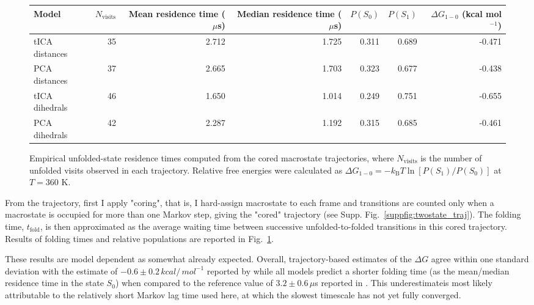 \documentclass[prl,twocolumn]{revtex4-1}
\begin{document}
\begin{figure}[t]
    \centering
        \begin{tabular}{lrrrrrr}
            \hline
            Model
            & $N_{\mathrm{visits}}$
            & Mean residence time ($\mu$s)
            & Median residence time ($\mu$s)
            & $P(S_0)$
            & $P(S_1)$
            & $\Delta G_{1-0}$ (kcal mol$^{-1}$) \\
            \hline
            tICA distances  & 35 & 2.712 & 1.725 & 0.311 & 0.689 & -0.471 \\
            PCA distances   & 37 & 2.665 & 1.703 & 0.323 & 0.677 & -0.438 \\
            tICA dihedrals  & 46 & 1.650 & 1.014 & 0.249 & 0.751 & -0.655 \\
            PCA dihedrals   & 42 & 2.287 & 1.192 & 0.315 & 0.685 & -0.461 \\
            \hline
        \end{tabular}%

    \vspace{1.2em}

    \caption{
        Empirical unfolded-state residence times
        computed from the cored macrostate trajectories, where
        $N_{\mathrm{visits}}$ is the number of unfolded visits observed in
        each trajectory. Relative free energies were calculated as
        $\Delta G_{1-0}=-k_{\mathrm B}T
        \ln[P(S_1)/P(S_0)]$ at $T=360$ K.
    }
    \label{fig:twostate_main_results}
\end{figure}

From the trajectory,  first I apply "coring", that is, I hard-assign macrostate to each frame and 
transitions are counted only when
a macrostate is occupied for more than one Markov step, giving the "cored"
trajectory (see Supp. Fig.~\ref{suppfig:twostate_traj}). The folding time,
$t_{\mathrm{fold}}$, is then approximated as the average waiting time
between successive unfolded-to-folded transitions in this cored trajectory.
Results of folding times and relative populations are reported in Fig.~\ref{fig:twostate_main_results}.

These results are model dependent as somewhat already expected. Overall, trajectory-based estimates of the $\Delta G$ agree within one standard deviation with the estimate of $-0.6 \pm 0.2\, kcal/\,mol^{-1}$ reported by \cite{Piana2012} while all models predict a shorter folding time (as the mean/median residence time in the state $S_0$) when compared to the reference value of $3.2\pm0.6\,\mu$s reported in \cite{Piana2012}. This underestimateis most likely attributable to the relatively short Markov lag time used
here, at which the slowest timescale has not yet fully converged. 
\end{document}
